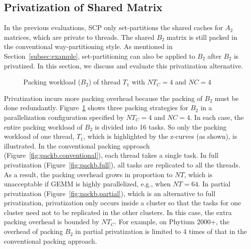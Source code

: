 \subsection{Privatization of Shared Matrix}\label{subsec:privb}
In the previous evaluations, SCP only set-partitions the shared caches
for $A_2$ matrices, which are private to threads.
The shared $B_2$ matrix is still packed
in the conventional way-partitioning style.
As mentioned in Section~\ref{subsec:example},
set-partitioning can also be applied to $B_2$ after $B_2$ is privatized.
In this section, we discuss and evaluate this privatization alternative.

\begin{figure}
  \centering
  \caption{Packing workload ($B_2$) of thread $T_1$ with $NT_C=4$ and $NC=4$}
  \label{fig:packb}
\end{figure}

Privatization incurs more packing overhead because
the packing of $B_2$ must be done redundantly.
Figure~\ref{fig:packb} shows three packing strategies for $B_2$
in a parallelization configuration specified by
$NT_C=4$ and $NC=4$.
In each case, the entire packing workload of $B_2$ is divided into 16 tasks.
So only the packing workload of one thread, $T_1$, 
which is highlighted by the z-curves (as shown), is illustrated.
In the conventional packing approach
(Figure~\ref{fig:packb.conventional}),
each thread takes a single task.
In full privatization
(Figure~\ref{fig:packb.full}),
all tasks are replicated to all
the threads.
As a result, the packing overhead grows in proportion to $NT$, which is unacceptable
if GEMM is highly parallelized, e.g., when $NT=64$.
In partial privatization 
(Figure~\ref{fig:packb.partial}), which is 
an alternative to full privatization,
privatization only occurs inside
a cluster so that the tasks for one cluster need not to be
replicated in the other clusters.
In this case, the extra packing overhead
is bounded by $NT_C$.
For example, on Phytium 2000+, the
overhead of packing $B_2$
in partial privatization is limited to 4 times
of that in the conventional packing approach.

